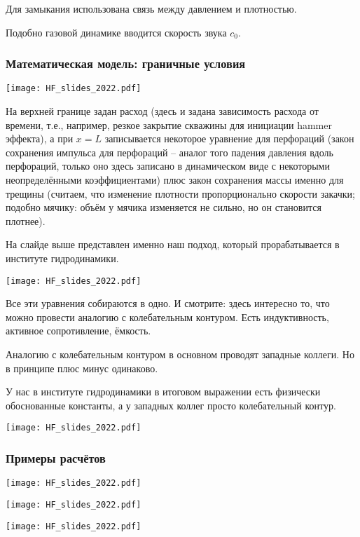 \documentclass[main.tex]{subfiles}
\begin{document}
Для замыкания использована связь между давлением и плотностью.

Подобно газовой динамике вводится скорость звука $c_0$.

\subsubsection{Математическая модель: граничные условия}

\texttt{[image: HF\_slides\_2022.pdf]}

На верхней границе задан расход (здесь и задана зависимость расхода от времени, т.е., например, резкое закрытие скважины для инициации hammer эффекта), а при $x=L$ записывается некоторое уравнение для перфораций (закон сохранения импульса для перфораций -- аналог того падения давления вдоль перфораций, только оно здесь записано в динамическом виде с некоторыми неопределёнными коэффициентами) плюс закон сохранения массы именно для трещины (считаем, что изменение плотности пропорционально скорости закачки; подобно мячику: объём у мячика изменяется не сильно, но он становится плотнее).

На слайде выше представлен именно наш подход, который прорабатывается в институте гидродинамики.

\texttt{[image: HF\_slides\_2022.pdf]}

Все эти уравнения собираются в одно.
И смотрите: здесь интересно то, что можно провести аналогию с колебательным контуром.
Есть индуктивность, активное сопротивление, ёмкость.

Аналогию с колебательным контуром в основном проводят западные коллеги.
Но в принципе плюс минус одинаково.

У нас в институте гидродинамики в итоговом выражении есть физически обоснованные константы, а у западных коллег просто колебательный контур.

\texttt{[image: HF\_slides\_2022.pdf]}

\subsubsection{Примеры расчётов}

\texttt{[image: HF\_slides\_2022.pdf]}

\texttt{[image: HF\_slides\_2022.pdf]}

\texttt{[image: HF\_slides\_2022.pdf]}
\end{document}
